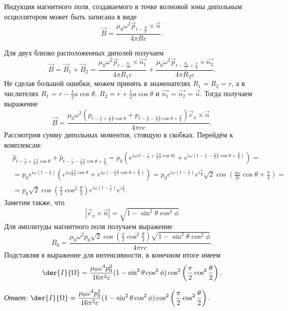 Индукция магнитного поля, создаваемого в точке волновой зоны дипольным
осциллятором может быть записана в виде
\[
    \vec{B} = \frac{\mu_0\omega^2\vec{p}_{t-\frac{R}{c}}\times\vec{n}}{4\pi Rc}.
\]

Для двух близко расположенных диполей получаем
\[
    \vec{B} = \vec{B}_1 + \vec{B}_2 =
    \frac{\mu_0\omega^2\vec{p}_{t-\frac{R_1}{c}}\times\vec{n_1}}{4\pi R_1c} +
    \frac{\mu_0\omega^2\vec{p}_{t-\frac{R_2}{c}+\frac{T}{4}}\times\vec{n_2}}
    {4\pi R_2c}.
\]
Не сделав большой ошибки, можем принять в знаменателях \( R_1 = R_2 = r \), а в
числителях \( R_1 = r - \frac{1}{2}{a\cos\theta},\ R_2 = r + \frac{1}{2}
{a\cos\theta} \) и \( \vec{n_1} = \vec{n_2} = \vec{n} \). Тогда получаем
выражение
\[
    \vec{B} = \frac{\mu_0\omega^2(p_{t-\frac{r}{c}+
    \frac{1}{2}{\frac{a}{c}\cos\theta}}+p_{t-\frac{r}{c}-
    \frac{1}{2}{\frac{a}{c}\cos\theta}+\frac{T}{4}})\vec{e}_x\times\vec{n}}
    {4\pi rc}.
\]
Рассмотрим сумму дипольных моментов, стоящую в скобках. Перейдём к комплексам:
\begin{align*}
    & \hat{p}_{t-\frac{r}{c}+\frac{1}{2}{\frac{a}{c}\cos\theta}} +
    \hat{p}_{t-\frac{r}{c}-\frac{1}{2}{\frac{a}{c}\cos\theta}+\frac{T}{4}} =
    p_0(e^{i\omega(t-\frac{r}{c}+\frac{1}{2}{\frac{a}{c}\cos\theta)}} +
    e^{i\omega(t-\frac{r}{c}-\frac{1}{2}{\frac{a}{c}\cos\theta}+\frac{T}{4})})=
    \\ &=
    p_0e^{i\omega(t-\frac{r}{c})}(e^{i\omega\frac{1}{2}\frac{a}{c}\cos\theta} +
    e^{i\omega(-\frac{1}{2}{\frac{a}{c}\cos\theta}+\frac{T}{4})}) = 
    p_0e^{i\omega(t-\frac{r}{c})}e^{i\frac{\pi}{4}}\sqrt{2}
    \cos\left(\frac{a\omega}{2c}\cos{\theta} + \frac{\pi}{4}\right) =\\
    &=
    p_0\sqrt{2}\cos\left(\frac{\pi}{2}\cos^2\frac{\theta}{2}\right)
    e^{i\omega(t-\frac{r}{c})}e^{i\frac{\pi}{4}}.
\end{align*}
Заметим также, что
\[
    |\vec{e}_x\times\vec{n}| = \sqrt{1-\sin^2\theta\cos^2\phi}
\]
Для амплитуды магнитного поля получаем выражение
\[
    B_0 = \frac{\mu_0\omega^2p_0\sqrt{2}
    \cos\left(\frac{\pi}{2}\cos^2\frac{\theta}{2}\right)
    \sqrt{1-\sin^2\theta\cos^2\phi}}{4\pi rc}.
\]
Подставляя в выражение для интенсивности, в конечном итоге имеем
\[
    \der{I}{\Omega} = \frac{\mu_0\omega^4p_0^2}{16\pi^2 c}
    (1-\sin^2\theta\cos^2\phi)
    \cos^2\left(\frac{\pi}{2}\cos^2\frac{\theta}{2}\right).
\]

\emph{Ответ:} \( \ds
    \der{I}{\Omega} = \frac{\mu_0\omega^4p_0^2}{16\pi^2 c}
    (1-\sin^2\theta\cos^2\phi)
    \cos^2\left(\frac{\pi}{2}\cos^2\frac{\theta}{2}\right).
\)

